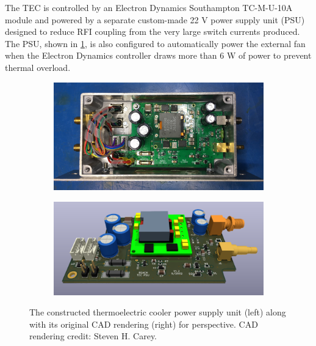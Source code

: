 The TEC is controlled by an Electron Dynamics Southampton TC-M-U-10A module and powered by a separate custom-made 22 V power supply unit (PSU) designed to reduce RFI coupling from the very large switch currents produced. The PSU, shown in \cref{fig:psu}, is also configured to automatically power the external fan when the Electron Dynamics controller draws more than 6 W of power to prevent thermal overload.
\begin{figure}
    \centering
    \begin{subfigure}{.45\textwidth}
        \centering
        \includegraphics[width=\linewidth]{psu}
    \end{subfigure}
    \hfill
    \begin{subfigure}{.52\textwidth}
    \centering
        \includegraphics[width=\linewidth]{cad_psu}
    \end{subfigure}
    \caption{The constructed thermoelectric cooler power supply unit (left) along with its original CAD rendering (right) for perspective. CAD rendering credit: Steven H. Carey.}
    \label{fig:psu}
\end{figure}

